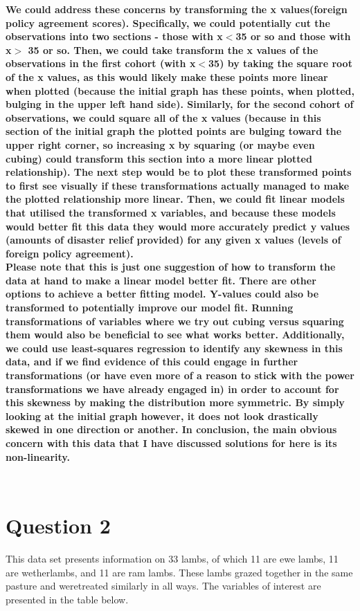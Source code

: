 \documentclass[12pt,letterpaper]{article}
\begin{document}
	\textbf{We could address these concerns by transforming the x values(foreign policy agreement scores). Specifically, we could potentially cut the observations into two sections - those with x$<$35 or so and those with x$>$ 35 or so. Then, we could take transform the x values of the observations in the first cohort (with x$<$35) by taking the square root of the x values, as this would likely make these points more linear when plotted (because the initial graph has these points, when plotted, bulging in the upper left hand side). Similarly, for the second cohort of observations, we could square all of the x values (because in this section of the initial graph the plotted points are bulging toward the upper right corner, so increasing x by squaring (or maybe even cubing) could transform this section into a more linear plotted relationship). The next step would be to plot these transformed points to first see visually if these transformations actually managed to make the plotted relationship more linear. Then, we could fit  linear models that utilised the transformed x variables, and because these models would better fit this data they would more accurately predict y values (amounts of disaster relief provided) for any given x values (levels of foreign policy agreement). }\\
	
	\textbf{Please note that this is just one suggestion of how to transform the data at hand to make a linear model better fit. There are other options to achieve a better fitting model. Y-values could also be transformed to potentially improve our model fit. Running transformations of variables where we try out cubing versus squaring them would also be beneficial to see what works better. Additionally, we could use least-squares regression to identify any skewness in this data, and if we find evidence of this could engage in further transformations (or have even more of a reason to stick with the power transformations we have already engaged in) in order to account for this skewness by making the distribution more symmetric. By simply looking at the initial graph however, it does not look drastically skewed in one direction or another. In conclusion, the main obvious concern with this data that I have discussed solutions for here is its non-linearity. }
	\begin{verbatim}
		
	\end{verbatim} 
	
\newpage
	
	\section*{Question 2}
	\vspace{.25cm}
	\noindent 
	This data set presents information on 33 lambs, of which 11 are ewe lambs, 11 are wetherlambs, and 11 are ram lambs. These lambs grazed together in the same pasture and weretreated similarly in all ways. The variables of interest are presented in the table below.
	
\end{document}
